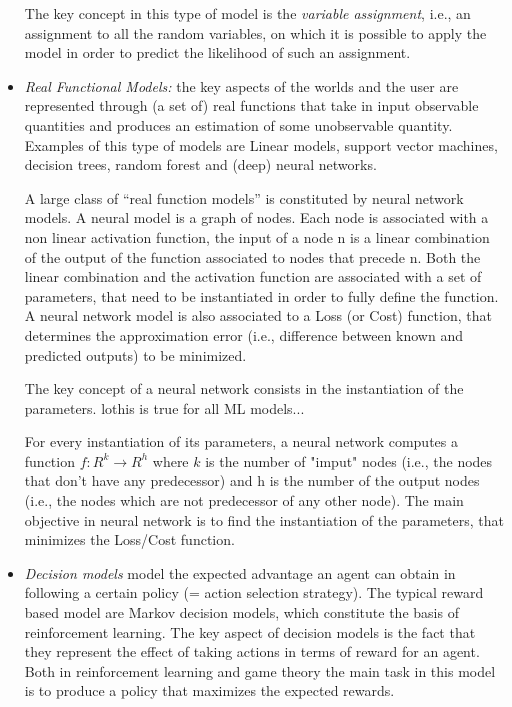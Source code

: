 \begin{itemize}
The key concept in this type of model is the \emph{variable assignment},
i.e., an assignment to all the random variables, on which it is
possible to apply the model in order to predict the likelihood of such
an assignment.

\item \emph{Real Functional Models:} the key aspects of the worlds and
  the user are represented through (a set of) real functions that
  take in input observable quantities and produces an estimation of
  some unobservable quantity. Examples of this type of models are
  Linear models, support vector machines, decision trees, random
  forest and (deep) neural networks.

  A large class of ``real function models'' is constituted by neural
  network models. A neural model is a graph of nodes. Each node is
  associated with a non linear activation function, the input of a
  node n is a linear combination of the output of the function
  associated to nodes that precede n. Both the linear combination and
  the activation function are associated with a set of parameters,
  that need to be instantiated in order to fully define the
  function. A neural network model is also associated to a Loss (or
  Cost) function, that determines the approximation error (i.e., difference between known and predicted outputs) to be minimized.

  The key concept of a neural network consists in the instantiation of the parameters.
  lo{this is true for all ML models...}

  For every instantiation of its parameters, a neural network
  computes a function $f:R^k\rightarrow R^h$ where $k$ is the number
  of "imput" nodes (i.e., the nodes that don't have any predecessor)
  and h is the number of the output nodes (i.e., the nodes which are
  not predecessor of any other node). The main objective in neural
  network is to find the instantiation of the parameters, that
  minimizes the Loss/Cost function.

\item \emph{Decision models} model the expected advantage an agent
  can obtain in following a certain policy (= action selection
  strategy). The typical reward based model are Markov decision
  models, which constitute the basis of reinforcement learning. The
  key aspect of decision models is the fact that they represent the
  effect of taking actions in terms of reward for an agent. Both in
  reinforcement learning and game theory the main task in this model
  is to produce a policy that maximizes the expected rewards.


\end{itemize}
